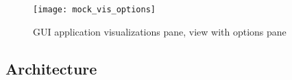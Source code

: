 \begin{figure}[ht]
  \centering
  \texttt{[image: mock\_vis\_options]}
  \caption{GUI application visualizations pane, view with options pane}
  \label{fig:mock_vis_options}
\end{figure}



\subsection{Architecture}
